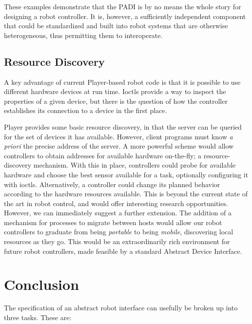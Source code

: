 \documentclass[letterpaper, 10 pt, conference]{iros03}
\begin{document}
These examples demonstrate that the PADI is by no means the whole
story for designing a robot controller. It is, however, a sufficiently
independent component that could be standardized and built into robot
systems that are otherwise heterogeneous, thus permitting them to
interoperate.

\subsection{Resource Discovery}

A key advantage of current Player-based robot code is that it is
possible to use different hardware devices at run time. Ioctls provide
a way to inspect the properties of a given device, but there
is the question of how the controller establishes its connection to a
device in the first place.

Player provides some basic resource discovery, in that the server can
be queried for the set of devices it has available. However, client
programs must know {\em a priori} the precise address of the server.
A more powerful scheme would allow controllers to obtain addresses for
available hardware on-the-fly; a resource-discovery mechanism. With
this in place, controllers could probe for available hardware and
choose the best sensor available for a task, optionally configuring it
with ioctls. Alternatively, a controller could change its planned
behavior according to the hardware resources available. This is beyond
the current state of the art in robot control, and would offer
interesting research opportunities. However, we can immediately
suggest a further extension. The addition of a mechanism for processes
to migrate between hosts would allow our robot controllers to graduate
from being {\em portable} to being {\em mobile}, discovering local
resources as they go. This would be an extraordinarily rich
environment for future robot controllers, made feasible by a standard
Abstract Device Interface.


\section{Conclusion}

The specification of an abstract robot interface can usefully be
broken up into three tasks. These are:
\end{document}
